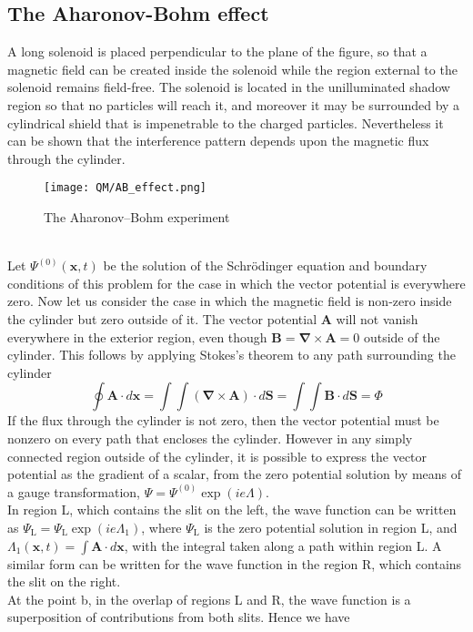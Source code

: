\subsection{The Aharonov-Bohm effect}
A long solenoid is placed perpendicular to the plane of the figure, so that a magnetic field can be created inside the solenoid while the region external to the solenoid remains field-free. The solenoid is located in the unilluminated shadow region so that no particles will reach it, and moreover it may be surrounded by a cylindrical shield that is impenetrable to the charged particles. Nevertheless it can be shown that the interference pattern depends upon the magnetic flux through the cylinder.\\
\begin{figure}[!h]
	\centering
	\texttt{[image: QM/AB\_effect.png]}
	\caption{The Aharonov–Bohm experiment}
\end{figure}\\
Let $\Psi^{(0)}(\bm{x},t)$ be the solution of the Schrödinger equation and boundary conditions of this problem for the case in which the vector potential is everywhere zero. Now let us consider the case in which the magnetic field is non-zero inside the cylinder but zero outside of it. The vector potential $\bm{A}$ will not vanish everywhere in the exterior region, even though $\bm{B}=\bm{\nabla}\times\bm{A}=0$
outside of the cylinder. This follows by applying Stokes's theorem to any path surrounding the cylinder
\[\oint \bm{A}\cdot d\bm{x} = \int\int (\bm{\nabla}\times\bm{A})\cdot d\bm{S} = \int\int \bm{B}\cdot d\bm{S} = \Phi\]
If the flux through the cylinder is not zero, then the vector potential must be nonzero on every path that encloses the cylinder. However in any simply connected region outside of the cylinder, it is possible to express the vector potential as the gradient of a scalar, from the zero potential solution by means of a gauge transformation, $\Psi = \Psi^{(0)}\exp(ie\Lambda)$.
\\
In region L, which contains the slit on the left, the wave function can be written as $\Psi_{\mathrm{L}} = \Psi_{\mathrm{L}}\exp(ie\Lambda_1)$, where $\Psi_{\mathrm{L}}$ is the zero potential solution in region L, and $\Lambda_1(\bm{x},t) = \int \bm{A}\cdot d\bm{x}$, with the integral taken along a path within region L. A similar form can be written for the wave function in the region R, which contains the slit on the right. \\
At the point b, in the overlap of regions L and R, the wave function is a superposition of contributions from both slits. Hence we have
